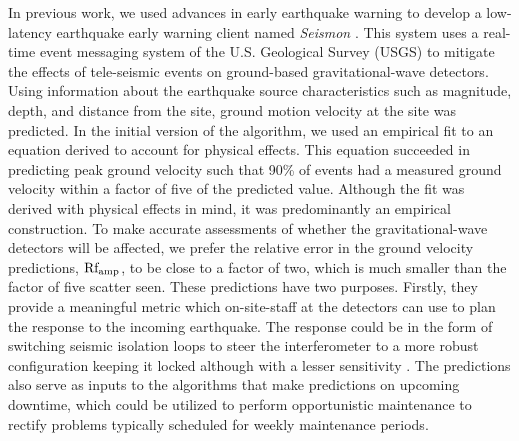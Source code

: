 \documentclass[twocolumn, aps, superscriptaddress]{revtex4}
\begin{document}
In previous work, we used advances in early earthquake warning to develop a low-latency earthquake early warning client named \emph{Seismon} \cite{CoEa2017}. This system uses a real-time event messaging system of the U.S. Geological Survey (USGS) to mitigate the effects of tele-seismic events on ground-based gravitational-wave detectors. 
Using information about the earthquake source characteristics such as magnitude, depth, and distance from the site, ground motion velocity at the site was predicted.
In the initial version of the algorithm, we used an empirical fit to an equation derived to account for physical effects. This equation succeeded in predicting peak ground velocity such that 90\% of events had a measured ground velocity within a factor of five of the predicted value. Although the fit was derived with physical effects in mind, it was predominantly an empirical construction. To make accurate assessments of whether the gravitational-wave detectors will be affected, we prefer the relative error in the ground velocity predictions, $\rm Rf_{amp}$, to be close to a factor of two, which is much smaller than the factor of five scatter seen. These predictions have two purposes. Firstly, they provide a meaningful metric which on-site-staff at the detectors can use to plan the response to the incoming earthquake. The response could be in the form of switching seismic isolation loops to steer the interferometer to a more robust configuration keeping it locked although with a lesser sensitivity \cite{BiWa2018}. The predictions also serve as inputs to the algorithms that make predictions on upcoming downtime, which could be utilized to perform opportunistic maintenance to rectify problems typically scheduled for weekly maintenance periods.
\end{document}

